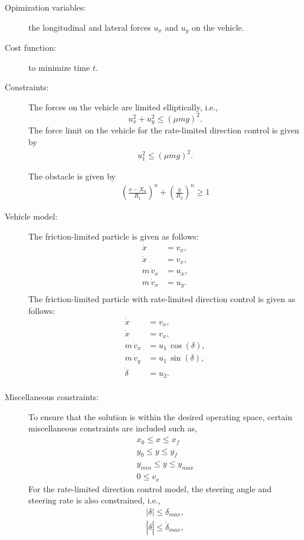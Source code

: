 \begin{description}
    \item[Opimization variables:] the longitudinal and lateral forces $u_x$ and $u_y$ on the vehicle. 
    \item[Cost function:] to minimize time $t$.
    \item[Constraints:] The forces on the vehicle are limited elliptically, i.e., \begin{equation*}
        u_x^2 + u_y^2 \leq (\mu m g)^2.
    \end{equation*}
    The force limit on the vehicle for the rate-limited direction control is given by \begin{align*}
        u_1^2 \leq (\mu m g)^2.
    \end{align*}\par The obstacle is given by 
    \begin{align*}
        \left(\frac{x - X_a}{R_1}\right)^n + \left(\frac{y}{R_2}\right)^n \geq 1
    \end{align*}
    \item[Vehicle model:] The friction-limited particle is given as follows: \begin{align*}
        \dot x &= v_x, \\
        \dot x &= v_x, \\
        m\,\dot v_x &= u_x,\\
        m\,\dot v_x &= u_y. \\
    \end{align*}
    The friction-limited particle with rate-limited direction control is given as follows: \begin{align*}
        \dot x &= v_x, \\
        \dot x &= v_x, \\
        m\,\dot v_x &= u_1\,\cos\left(\delta\right),\\
        m\,\dot v_y &= u_1\,\sin\left(\delta\right), \\
        \dot \delta &= u_2. \\
    \end{align*}
    \item[Miscellaneous constraints:] To ensure that the solution is within the desired operating space, certain miscellaneous constraints are included such as, \begin{align*}
        x_0 \leq x \leq x_f\\
        y_0 \leq y \leq y_f\\
        y_{min} \leq y \leq y_{max} \\
        0 \leq v_x 
    \end{align*} 
    For the rate-limited direction control model, the steering angle and steering rate is also constrained, i.e., \begin{align*}
        |\delta| \leq \delta_{max}, \\
        |\dot\delta| \leq \dot\delta_{max}, \\
    \end{align*}
\end{description}

